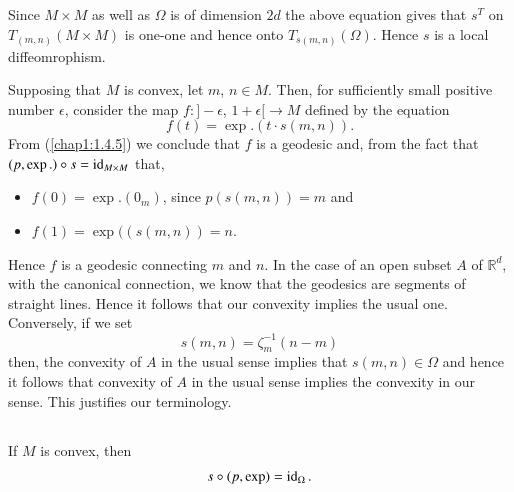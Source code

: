 \setcounter{subsection}{1}

\subsection{}\label{chap2:2.6.2}

Since $M\times M$ as well as $\Omega$ is of dimension $2d$ the above
equation gives that $s^{T}$ on $T_{(m,n)}(M\times M)$ is one-one and
hence onto $T_{s(m,n)}(\Omega)$. Hence $s$ is a local diffeomrophism. 

Supposing that $M$ is convex, let $m$, $n\in M$. Then, for
sufficiently small positive number $\epsilon$, consider the map
$f:]-\epsilon$, $1+\epsilon[\to M$ defined by the equation
$$
f(t)=\exp. (t\cdot s(m,n)).
$$
From (\ref{chap1:1.4.5}) we conclude that $f$ is a geodesic and, from the
fact that $(p,\exp.)\circ s=\operatorname{id}_{M\times M}$ that,
\begin{itemize}
\item[i)] $f(0)=\exp.(0_{m})$, since $p(s(m,n))=m$ and

\item[ii)] $f(1)=\exp((s(m,n))=n$.
\end{itemize}
Hence $f$ is a geodesic connecting $m$ and $n$. In the case of an open
subset $A$ of $\mathbb{R}^{d}$, with the canonical connection, we know
that the geodesics are segments of straight lines. Hence it follows
that our convexity implies the usual one. Conversely, if we set
\begin{equation*}
s(m,n)=\zeta^{-1}_{m}(n-m)\tag{2.6.3}\label{chap2:2.6.3}
\end{equation*}
then, the convexity of $A$ in the usual sense implies that
$s(m,n)\in\Omega$ and hence it follows that convexity of $A$ in the
usual sense implies the convexity in our sense. This justifies our
terminology.

\setcounter{subsection}{3}

\subsection{}\label{chap2:2.6.4}

\begin{prop*}
If $M$ is convex, then 
$$
s\circ (p,\exp)=\operatorname{id}_{\Omega}.
$$
\end{prop*}

\subsection{}\label{chap2:2.6.5}

